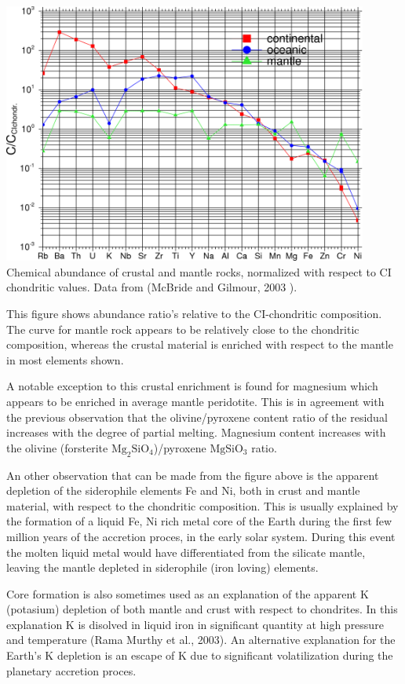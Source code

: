 \begin{center}
\includegraphics[width=12cm]{images/gravity/abund}\\
{\captionfont 
Chemical abundance of crustal and mantle rocks,
normalized with respect to CI chondritic values.
Data from (McBride and Gilmour, 2003 \cite{mcgi03}).
}
\end{center}

This figure shows abundance ratio's relative to the CI-chondritic composition.
The curve for mantle rock appears to be relatively close to the chondritic composition,
whereas the crustal material is enriched with respect to the mantle in
most elements shown.

A notable exception to this crustal enrichment is found for magnesium which appears
to be enriched in average mantle peridotite.
This is in agreement with the previous observation that 
the olivine/pyroxene content ratio of the residual increases with the
degree of partial melting.
Magnesium content increases with the olivine 
(forsterite $\mathrm{Mg_2SiO_4}$)/pyroxene $\mathrm{MgSiO_3}$ ratio.

An other observation that can be made from the figure above 
is the apparent depletion of the siderophile elements Fe and Ni, both in
crust and mantle material, with respect to the chondritic composition.
This is usually explained by the formation of a liquid Fe, Ni rich metal core
of the Earth during the first few million years of the accretion proces,
in the early solar system.
During this event the molten liquid metal would have differentiated from the 
silicate mantle, leaving the mantle depleted in siderophile (iron loving) elements.

Core formation is also sometimes used as an explanation of the apparent K
(potasium) depletion of both mantle and crust with respect to chondrites.
In this explanation K is disolved in liquid iron in significant quantity
at high pressure and temperature (Rama Murthy et al., 2003).
An alternative explanation for the Earth's K depletion is an escape
of K due to significant volatilization during the planetary accretion proces. 

